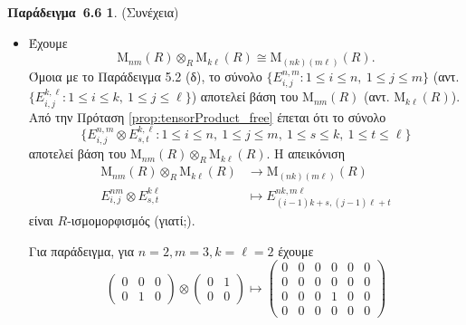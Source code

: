 \documentclass[12pt,a4paper,reqno]{amsart}
\theoremstyle{definition}
\newtheorem*{example_6.6}{Παράδειγμα~6.6}
\theoremstyle{remark}
\numberwithin{theorem}{section}
\numberwithin{exercise}{section}
\numberwithin{equation}{section}
\newcommand{\rmM}{\mathrm{M}}
\renewcommand{\to}{\rightarrow}
\begin{document}
\begin{example_6.6}{\rm(Συνέχεια)}
    \leavevmode
    \begin{itemize}
        \item[(η)] Έχουμε 
        \[
        \rmM_{nm}(R) \otimes_R \rmM_{k\ell}(R) \cong \rmM_{(nk)(m\ell)}(R).
        \]
        Όμοια με το Παράδειγμα 5.2 (δ), το σύνολο $\{E_{i,j}^{n,m} : 1 \leq i \leq n, \ 1 \le j \le m\}$ (αντ. $\{E_{i,j}^{k,\ell} : 1 \leq i \leq k, \ 1 \le j \le \ell\}$) αποτελεί βάση του $\rmM_{nm}(R)$ (αντ. $\rmM_{k\ell}(R)$). Από την Πρόταση \ref{prop:tensorProduct_free} έπεται ότι το σύνολο 
        \[
        \{
            E_{i,j}^{n,m} \otimes E_{s,t}^{k,\ell} : 1 \leq i \leq n, \ 1 \le j \le m, \ 1 \leq s \leq k, \ 1 \le t \le \ell
        \}
        \]
        αποτελεί βάση του $\rmM_{nm}(R) \otimes_R \rmM_{k\ell}(R)$. Η απεικόνιση 
        \begin{align*}
            \rmM_{nm}(R) \otimes_R \rmM_{k\ell}(R) &\to \rmM_{(nk)(m\ell)}(R) \\ 
            E_{i,j}^{nm} \otimes E_{s,t}^{k\ell} &\mapsto 
            E_{(i-1)k +s, (j-1)\ell+t}^{nk, m\ell}
        \end{align*}
        είναι $R$-ισμομορφισμός (γιατί;).

        Για παράδειγμα, για $n=2, m=3, k=\ell=2$ έχουμε 
        \[
        \begin{pmatrix}
        0 & 0 & 0 \\
        0 & 1 & 0
        \end{pmatrix}
         \otimes \begin{pmatrix}
            0 & 1 \\
            0 & 0
         \end{pmatrix} \mapsto
        \left(
        \begin{array}{cc|cc|cc}
        0 & 0 & 0 & 0 & 0 & 0 \\
        0 & 0 & 0 & 0 & 0 & 0 \\
        \hline
        0 & 0 & 0 & 1 & 0 & 0 \\
        0 & 0 & 0 & 0 & 0 & 0
        \end{array}
        \right)
        \]


\end{itemize}
\end{example_6.6}
\end{document}
